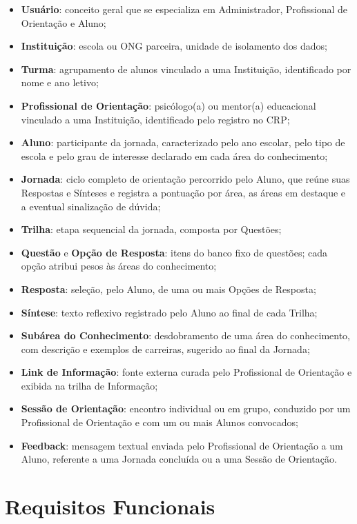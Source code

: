 \begin{itemize}
  \item \textbf{Usuário}: conceito geral que se especializa em Administrador, Profissional de Orientação e Aluno;
  \item \textbf{Instituição}: escola ou ONG parceira, unidade de isolamento dos dados;
  \item \textbf{Turma}: agrupamento de alunos vinculado a uma Instituição, identificado por nome e ano letivo;
  \item \textbf{Profissional de Orientação}: psicólogo(a) ou mentor(a) educacional vinculado a uma Instituição, identificado pelo registro no CRP;
  \item \textbf{Aluno}: participante da jornada, caracterizado pelo ano escolar, pelo tipo de escola e pelo grau de interesse declarado em cada área do conhecimento;
  \item \textbf{Jornada}: ciclo completo de orientação percorrido pelo Aluno, que reúne suas Respostas e Sínteses e registra a pontuação por área, as áreas em destaque e a eventual sinalização de dúvida;
  \item \textbf{Trilha}: etapa sequencial da jornada, composta por Questões;
  \item \textbf{Questão} e \textbf{Opção de Resposta}: itens do banco fixo de questões; cada opção atribui pesos às áreas do conhecimento;
  \item \textbf{Resposta}: seleção, pelo Aluno, de uma ou mais Opções de Resposta;
  \item \textbf{Síntese}: texto reflexivo registrado pelo Aluno ao final de cada Trilha;
  \item \textbf{Subárea do Conhecimento}: desdobramento de uma área do conhecimento, com descrição e exemplos de carreiras, sugerido ao final da Jornada;
  \item \textbf{Link de Informação}: fonte externa curada pelo Profissional de Orientação e exibida na trilha de Informação;
  \item \textbf{Sessão de Orientação}: encontro individual ou em grupo, conduzido por um Profissional de Orientação e com um ou mais Alunos convocados;
  \item \textbf{Feedback}: mensagem textual enviada pelo Profissional de Orientação a um Aluno, referente a uma Jornada concluída ou a uma Sessão de Orientação.
\end{itemize}

\section{Requisitos Funcionais}\label{sec:rf}

